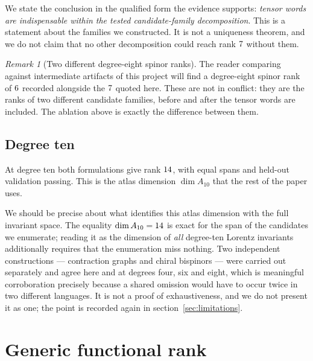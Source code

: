 \documentclass[11pt,a4paper]{article}
\theoremstyle{definition}
\theoremstyle{remark}
\newtheorem{remark}[theorem]{Remark}
\newcommand{\Ften}{A_{10}}
\begin{document}
We state the conclusion in the qualified form the evidence supports: \emph{tensor
words are indispensable within the tested candidate-family decomposition}. This
is a statement about the families we constructed. It is not a uniqueness theorem,
and we do not claim that no other decomposition could reach rank
$7$ without them.

\begin{remark}[Two different degree-eight spinor ranks]
The reader comparing against intermediate artifacts of this project will find a
degree-eight spinor rank of $6$ recorded alongside the
$7$ quoted here. These are not in conflict: they are the ranks of
two different candidate families, before and after the tensor words are included.
The ablation above is exactly the difference between them.
\end{remark}

\subsection{Degree ten}
At degree ten both formulations give rank $14$, with equal spans
and held-out validation passing. This is the atlas dimension $\dim \Ften$ that
the rest of the paper uses.

We should be precise about what identifies this atlas dimension with the full
invariant space. The equality $\dim \Ften = \traceRankDegTen$ is exact for the
span of the candidates we enumerate; reading it as the dimension of \emph{all}
degree-ten Lorentz invariants additionally requires that the enumeration miss
nothing. Two independent constructions --- contraction graphs and chiral
bispinors --- were carried out separately and agree here and at degrees four,
six and eight, which is meaningful corroboration precisely because a shared
omission would have to occur twice in two different languages. It is not a
proof of exhaustiveness, and we do not present it as one; the point is recorded
again in section~\ref{sec:limitations}.

\section{Generic functional rank}
\label{sec:rank}
\end{document}
